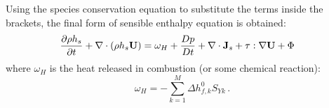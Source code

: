 Using the species conservation equation to substitute the terms inside the brackets, the final form of sensible enthalpy equation is obtained:
\begin{equation}
\begin{split}
\frac{\partial \rho h_s}{\partial t} +  \nabla \cdot \left( \rho h_s \mathbf{U} \right) &= \omega_H+\frac{Dp}{Dt} + \nabla \cdot \mathbf{J}_s +  \mathbf{\tau} : \nabla\mathbf{U} + \Phi 
\end{split}
\end{equation}
where $\omega_H$ is the heat released in combustion (or some chemical reaction):
\begin{equation}
 \omega_H = - \sum_{k=1}^{M} \Delta h^{0}_{f,k}  S_{Yk} \, .
\end{equation}
